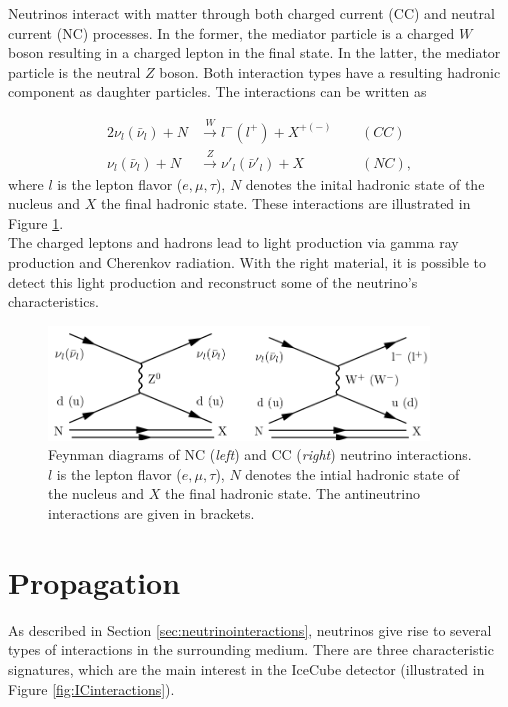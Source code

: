 \noindent Neutrinos interact with matter through both charged current (CC) and neutral current (NC) processes. In the former, the mediator particle is a charged $W$ boson resulting in a charged lepton in the final state. In the latter, the mediator particle is the neutral $Z$ boson. Both interaction types have a resulting hadronic component as daughter particles. The interactions can be written as

\begin{alignat}{2}
\nu_l \left(\bar{\nu}_l\right) + N &\xrightarrow{W} l^- \left(l^+\right) + X^{+\left(-\right)} \ \ && \left(CC\right)\\
\nu_l \left(\bar{\nu}_l\right) + N &\xrightarrow{Z} \nu'_l \left(\bar{\nu}'_l\right) + X && \left(NC\right),
\end{alignat}
where $l$ is the lepton flavor ($e,\mu,\tau$), $N$ denotes the inital hadronic state of the nucleus and $X$ the final hadronic state. These interactions are illustrated in Figure \ref{fig:feynmanneutrino}.\\
\newline
The charged leptons and hadrons lead to light production via gamma ray production and Cherenkov radiation. With the right material, it is possible to detect this light production and reconstruct some of the neutrino's characteristics.

\begin{figure}[t]
\centering
\includegraphics[width = 0.9\textwidth]{chapter4/img/feynmanneutrino.png}
\caption{Feynman diagrams of NC (\textit{left}) and CC (\textit{right}) neutrino interactions. $l$ is the lepton flavor ($e,\mu,\tau$), $N$ denotes the intial hadronic state of the nucleus and $X$ the final hadronic state. The antineutrino interactions are given in brackets.}
\label{fig:feynmanneutrino}
\end{figure}


\section{Propagation}
\label{sec:propagation}
As described in Section \ref{sec:neutrinointeractions}, neutrinos give rise to several types of interactions in the surrounding medium. There are three characteristic signatures, which are the main interest in the IceCube detector (illustrated in Figure \ref{fig:ICinteractions}).

